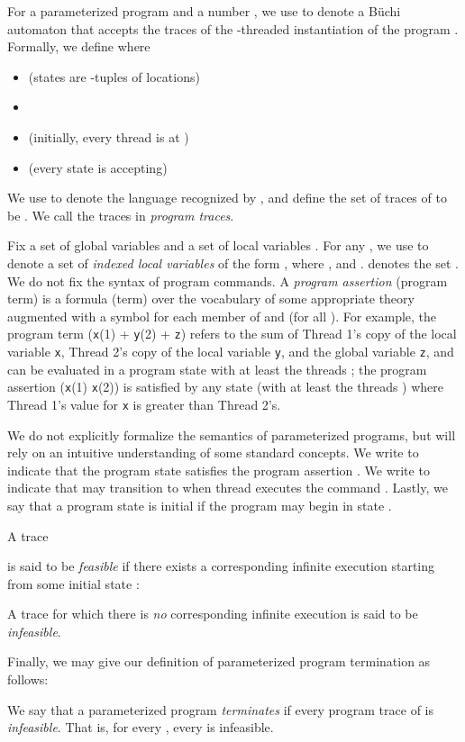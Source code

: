 \documentclass[9pt,nocopyrightspace]{sigplanconf}
\theoremstyle{definition}
\begin{document}
For a parameterized program  and a number , we use 
to denote a B\"{u}chi automaton that accepts the traces of the -threaded
instantiation of the program .  Formally, we define  where
\begin{itemize}
\item  (states are -tuples of locations)
\item 
\item  (initially, every thread is at )
\item  (every state is accepting)
\end{itemize}
We use  to denote the language recognized by , and define
the set of traces of  to be .  We call the traces in  \emph{program traces}.


Fix a set of global variables  and a set of local variables .  For
any , we use  to denote a set of \emph{indexed
  local variables} of the form , where , and
.   denotes the set .  We
do not fix the syntax of program commands.  A \emph{program assertion}
(program term) is a formula (term) over the vocabulary of some appropriate
theory augmented with a symbol for each member of  and  (for
all ).  For example, the program term (\texttt{x}(1) + \texttt{y}(2) +
\texttt{z}) refers to the sum of Thread 1's copy of the local variable
\texttt{x}, Thread 2's copy of the local variable \texttt{y}, and the global
variable \texttt{z}, and can be evaluated in 
a program state with at least the
threads ; the program assertion (\texttt{x}(1)  \texttt{x}(2)) is
satisfied by any state (with at least the threads ) where Thread 1's
value for \texttt{x} is greater than Thread 2's.

We do not explicitly formalize the semantics of parameterized programs, but
will rely on an intuitive understanding of some standard concepts.  We write
 to indicate that the program state  satisfies the program
assertion .  We write  to
indicate that  may transition to  when thread  executes the
command .  Lastly, we say that a program state  is initial if the
program may begin in state .

A trace

is said to be \emph{feasible} if there exists a corresponding infinite
execution starting from some initial state :

A trace for which there is \emph{no} corresponding infinite execution is said to be \emph{infeasible}.

Finally, we may give our definition of parameterized program termination as follows:
\begin{definition}\label{def:parameterizedtermination}
  We say that a parameterized program  \emph{terminates} if every program trace
of 
is \emph{infeasible}.  
That is, for
  every , every  is infeasible.
\end{definition}
\end{document}
